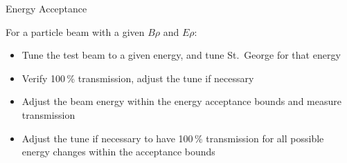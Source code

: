 \documentclass[10pt]{beamer}
\begin{document}




\begin{frame}[fragile]{Energy Acceptance}

    For a particle beam with a given $B\rho$ and $E\rho$:

    \begin{itemize}
        \item Tune the test beam to a given energy, and
            tune St.\ George for that energy
        \item Verify 100\,\% transmission, adjust the tune
            if necessary
        \item Adjust the beam energy within the energy
            acceptance bounds and measure transmission
        \item Adjust the tune if necessary to have 100\,\%
            transmission for all possible energy changes within the
            acceptance bounds
    \end{itemize}

\end{frame}
\end{document}

